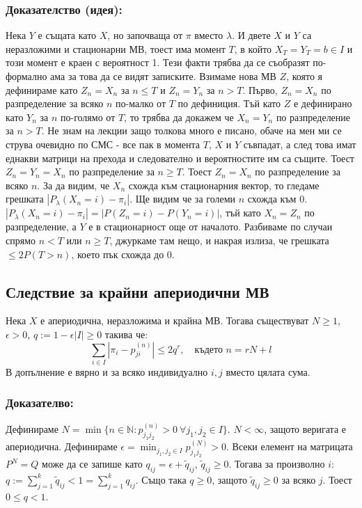 \documentclass{article}
\begin{document}
\subsubsection*{Доказателство (идея):}
Нека $Y$ е същата като $X$, но започваща от $\pi$ вместо $\lambda$. И двете $X$ и $Y$ са неразложими и стационарни МВ, тоест има момент $T$, в 
който $X_T = Y_T = b \in I$ и този момент е краен с вероятност 1. Тези факти трябва да се съобразят по-формално ама за това да се 
видят записките. Взимаме нова МВ $Z$, която я дефинираме като $Z_n = X_n$ за $n \leq T$ и $Z_n = Y_n$ за $n > T$. Първо, $Z_n = X_n$ по разпределение 
за всяко $n$ по-малко от $T$ по дефиниция. Тъй като $Z$ е дефинирано като $Y_n$ за $n$ по-голямо от $T$, то трябва да докажем 
че $X_n = Y_n$ по разпределение за $n > T$. Не знам на лекции защо толкова много е писано, обаче на мен ми се струва очевидно по СМС - все пак 
в момента $T$, $X$ и $Y$ съвпадат, а след това имат еднакви матрици на прехода и следователно и вероятностите им са същите. 
Тоест $Z_n = Y_n = X_n$ по разпределение за $n \geq T$. Тоест $Z_n = X_n$ по разпределение за всяко $n$. За да видим, че 
$X_n$ схожда към стационарния вектор, то гледаме грешката $|P_\lambda(X_n = i) - \pi_i|$. Ще видим че за големи $n$ схожда към 0. 
$|P_\lambda(X_n = i) - \pi_i| = |P(Z_n = i) - P(Y_n = i)|$, тъй като $X_n = Z_n$ по разпределение, а $Y$ е в стационарност още от началото. Разбиваме по случаи 
спрямо $n < T$ или $n \geq T$, джуркаме там нещо, и накрая излиза, че грешката $\leq 2P(T > n)$, което пък схожда до 0.

\subsection{Следствие за крайни апериодични МВ}
Нека $X$ е апериодична, неразложима и крайна МВ. Тогава съществуват $N \geq 1$, $\epsilon > 0$, $q := 1 - \epsilon|I| \geq 0$ такива че:
$$\sum_{i \in I} |\pi_i - p_{ji}^{(n)}| \leq 2q^r, \quad \text{където } n = rN + l$$
В допълнение е вярно и за всяко индивидуално $i,j$ вместо цялата сума.

\subsubsection*{Доказателво:}
Дефинираме $N = \min\{n\in \mathbb{N} : p_{j_1j_2}^{(n)} > 0 \ \forall j_1,j_2 \in I\}$. $N < \infty$, защото веригата е апериодична. Дефинираме $\epsilon = \min_{j_1,j_2 \in I} p_{j_1j_2}^{(N)} > 0$. 
Всеки елемент на матрицата $P^N = Q$ може да се запише като $q_{ij} = \epsilon + \tilde{q}_{ij}$, $\tilde{q}_{ij} \geq 0$. 
Тогава за произволно $i$: $q := \sum_{j=1}^k \tilde{q}_{ij} < 1 = \sum_{j=1}^k q_{ij}$. 
Също така $q \geq 0$, защото $\tilde{q}_{ij} \geq 0$ за всяко $j$. Тоест $0 \leq q < 1$. \\
\end{document}
